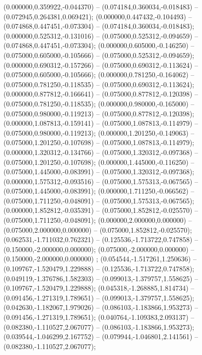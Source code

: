 (0.000000,0.359922,-0.044370) -- (0.074184,0.360034,-0.018483) -- (0.072945,0.264381,0.069421);
 (0.000000,0.447432,-0.104493) -- (0.074868,0.447451,-0.073304) -- (0.074184,0.360034,-0.018483);
 (0.000000,0.525312,-0.131016) -- (0.075000,0.525312,-0.094659) -- (0.074868,0.447451,-0.073304);
 (0.000000,0.605000,-0.146250) -- (0.075000,0.605000,-0.105666) -- (0.075000,0.525312,-0.094659);
 (0.000000,0.690312,-0.157266) -- (0.075000,0.690312,-0.113624) -- (0.075000,0.605000,-0.105666);
 (0.000000,0.781250,-0.164062) -- (0.075000,0.781250,-0.118535) -- (0.075000,0.690312,-0.113624);
 (0.000000,0.877812,-0.166641) -- (0.075000,0.877812,-0.120398) -- (0.075000,0.781250,-0.118535);
 (0.000000,0.980000,-0.165000) -- (0.075000,0.980000,-0.119213) -- (0.075000,0.877812,-0.120398);
 (0.000000,1.087813,-0.159141) -- (0.075000,1.087813,-0.114979) -- (0.075000,0.980000,-0.119213);
 (0.000000,1.201250,-0.149063) -- (0.075000,1.201250,-0.107698) -- (0.075000,1.087813,-0.114979);
 (0.000000,1.320312,-0.134766) -- (0.075000,1.320312,-0.097368) -- (0.075000,1.201250,-0.107698);
 (0.000000,1.445000,-0.116250) -- (0.075000,1.445000,-0.083991) -- (0.075000,1.320312,-0.097368);
 (0.000000,1.575312,-0.093516) -- (0.075000,1.575313,-0.067565) -- (0.075000,1.445000,-0.083991);
 (0.000000,1.711250,-0.066562) -- (0.075000,1.711250,-0.048091) -- (0.075000,1.575313,-0.067565);
 (0.000000,1.852812,-0.035391) -- (0.075000,1.852812,-0.025570) -- (0.075000,1.711250,-0.048091);
 (0.000000,2.000000,0.000000) -- (0.075000,2.000000,0.000000) -- (0.075000,1.852812,-0.025570);
 (0.062531,-1.711032,0.762321) -- (0.125536,-1.713722,0.747858) -- (0.150000,-2.000000,0.000000);
 (0.075000,-2.000000,0.000000) -- (0.150000,-2.000000,0.000000) ;
 (0.054544,-1.517261,1.250636) -- (0.109767,-1.520479,1.229888) -- (0.125536,-1.713722,0.747858);
 (0.049119,-1.376786,1.582303) -- (0.099013,-1.379757,1.558625) -- (0.109767,-1.520479,1.229888);
 (0.045318,-1.268885,1.814734) -- (0.091456,-1.271319,1.789651) -- (0.099013,-1.379757,1.558625);
 (0.042630,-1.182067,1.979026) -- (0.086103,-1.183866,1.953273) -- (0.091456,-1.271319,1.789651);
 (0.040764,-1.109383,2.093137) -- (0.082380,-1.110527,2.067077) -- (0.086103,-1.183866,1.953273);
 (0.039544,-1.046299,2.167752) -- (0.079944,-1.046801,2.141561) -- (0.082380,-1.110527,2.067077);
